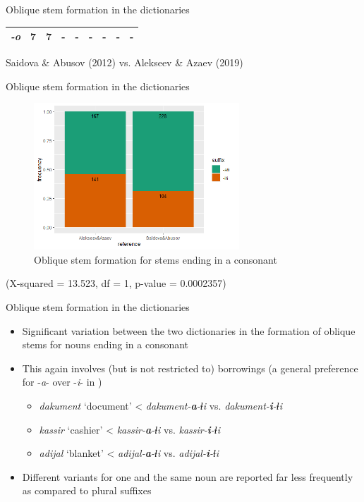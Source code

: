 \begin{frame}{Oblique stem formation in the dictionaries}
\begin{table}[]
\begin{tabular}{|c|c|c|c|c|c|c|c|c|}
\textit{-o} & {\color[HTML]{1B9045} 7}   & {\color[HTML]{CE6301} 7}   & {\color[HTML]{1B9045} -}            & {\color[HTML]{CE6301} -}            & {\color[HTML]{1B9045} -}            & {\color[HTML]{CE6301} -}            & {\color[HTML]{1B9045} -}  & {\color[HTML]{CE6301} -}  \\ \hline
\end{tabular}
\end{table}
\centering
\small {\color[HTML]{1B9045} Saidova \& Abusov (2012)} vs. {\color[HTML]{CE6301} Alekseev \& Azaev (2019)}
\end{frame}

\begin{frame}{Oblique stem formation in the dictionaries}
\begin{figure}[h]
\centering
\caption{Oblique stem formation for stems ending in a consonant}
\includegraphics[height=5.5cm]{images/genitive.png}
\end{figure}
\centering
\small (X-squared = 13.523, df = 1, p-value = 0.0002357)
\end{frame}

\begin{frame}{Oblique stem formation in the dictionaries}
\begin{itemize}
    \item Significant variation between the two dictionaries in the formation of oblique stems for nouns ending in a consonant
    \item This again involves (but is not restricted to) borrowings (a general preference for -\textit{a}- over -\textit{i}- in \citep{saidovaabusov2012})
    \begin{itemize}
        \item \textit{dakument} `document' < \textit{dakument-\textbf{a}-ɬi} vs. \textit{dakument-\textbf{i}-ɬi}
        \item \textit{kassir} `cashier' < \textit{kassir-\textbf{a}-ɬi} vs. \textit{kassir-\textbf{i}-ɬi} 
        \item \textit{adijal} `blanket' < \textit{adijal-\textbf{a}-ɬi} vs. \textit{adijal-\textbf{i}-ɬi} 
    \end{itemize}
    \item Different variants for one and the same noun are reported far less frequently as compared to plural suffixes
\end{itemize}
\end{frame}

